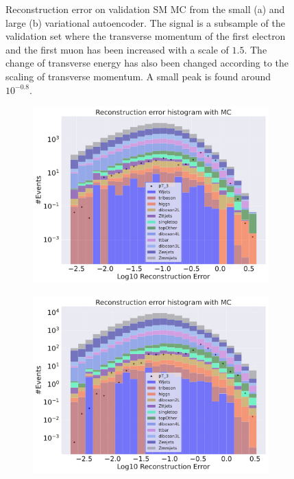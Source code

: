 \begin{figure}[H]
\begin{subfigure}{.45\textwidth}
        \caption{ }
        \label{fig:VAE_big_pt_1_5}
    \end{subfigure}
    \hfill 
    \caption[VAE |Reconstruction error $p_T$ altering of 1.5]{Reconstruction error on validation SM MC from the small (a) and large (b) variational autoencoder. The signal is a subsample of the validation 
    set where the transverse momentum of the first electron and the first muon has been increased with a scale of $1.5$. The change of transverse 
    energy has also been changed according to the scaling of transverse momentum. A small peak is found around $10^{-0.8}$. }
    \label{fig:VAE_big_small_pt_1_5}
\end{figure}

\begin{figure}[H]
    \centering
    \begin{subfigure}{.45\textwidth}
        \includegraphics[width=\textwidth]{Figures/VAE_testing/small/b_data_recon_big_rm3_feats_sig_pT_3.pdf}
        \caption{ }
        \label{fig:VAE_small_pt_3}
    \end{subfigure}
    \hfill 
    \begin{subfigure}{.45\textwidth}
        \includegraphics[width=\textwidth]{Figures/VAE_testing/big/b_data_recon_big_rm3_feats_sig_pT_3.pdf}

\end{subfigure}
\end{figure}
